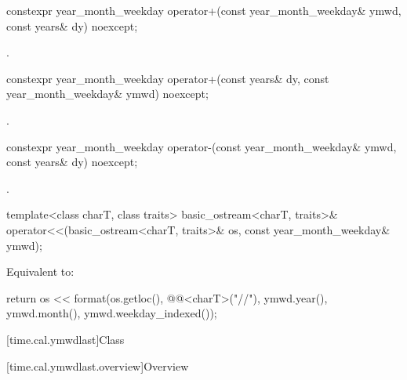 %
\begin{itemdecl}
constexpr year_month_weekday operator+(const year_month_weekday& ymwd, const years& dy) noexcept;
\end{itemdecl}

\begin{itemdescr}
\pnum
\returns
{}.
\end{itemdescr}

%
\begin{itemdecl}
constexpr year_month_weekday operator+(const years& dy, const year_month_weekday& ymwd) noexcept;
\end{itemdecl}

\begin{itemdescr}
\pnum
\returns
{}.
\end{itemdescr}

%
\begin{itemdecl}
constexpr year_month_weekday operator-(const year_month_weekday& ymwd, const years& dy) noexcept;
\end{itemdecl}

\begin{itemdescr}
\pnum
\returns
{}.
\end{itemdescr}

%
\begin{itemdecl}
template<class charT, class traits>
  basic_ostream<charT, traits>&
    operator<<(basic_ostream<charT, traits>& os, const year_month_weekday& ymwd);
\end{itemdecl}

\begin{itemdescr}
\pnum
\effects
Equivalent to:
\begin{codeblock}
return os << format(os.getloc(), @@<charT>("{}/{}/{}"),
                    ymwd.year(), ymwd.month(), ymwd.weekday_indexed());
\end{codeblock}
\end{itemdescr}

[time.cal.ymwdlast]{Class }

[time.cal.ymwdlast.overview]{Overview}

